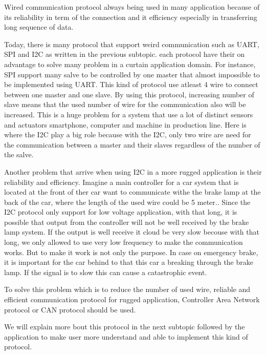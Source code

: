 
	Wired communication protocol always being used in many application because of its reliability in term of the connection and it efficiency especially  in transferring long sequence of data.
	
	Today, there is many protocol that support weird communication such as UART, SPI and I2C as written in the previous subtopic. each protocol have their on advantage to solve many problem in a curtain application domain. For instance, SPI support many salve to be controlled by one master that almost impossible to be implemented using UART. This kind of protocol use atleast 4 wire to connect between one master and one slave. By using this protocol, increasing number of slave means that the used number of wire for the communication also will be increased. This is a huge problem for a system that use a lot of distinct sensors and actuators smartphone, computer and machine in production line. Here is where the I2C play a big role because with the I2C, only two wire are need for the communication between a master and their slaves regardless of the number of the salve.
	
	Another problem that arrive when using I2C in a more rugged application is their reliability and efficiency. Imagine a main controller for a car system that is located at the front of ther car want to communicate withe the brake lamp at the back of the car, where the length of the used wire could be 5 meter.. Since the I2C protocol only support for low voltage application, with that long, it is possible that output from the controller will not be well received by the brake lamp system. If the output is well receive it cloud be very slow becouse with that long, we only allowed to use very low frequency to make the communication works. But to make it work is not only the purpose. In case on emergency brake, it is important for the car behind to that this car a breaking through the brake lamp. If the signal is to slow this can cause a catastrophic event.
	
	To solve this problem which is to reduce the number of used wire, reliable and efficient communication protocol for rugged application, Controller Area Network protocol or CAN protocol should be used. 
	
	We will explain more bout this protocol in the next subtopic followed by the application to make user more understand and able to implement this kind of protocol.



